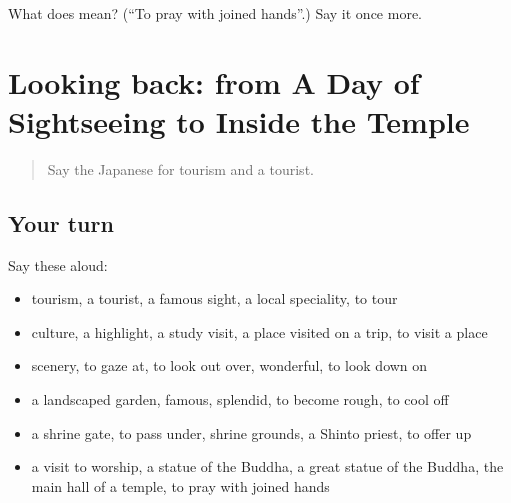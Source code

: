 \begin{tcolorbox}[breakable,colback=teal!4,colframe=teal!35!black,title={Before you move on}]
What does  mean? (\textquotedblleft{}To pray with joined hands\textquotedblright{}.) Say it once more.
\end{tcolorbox}
\section[(dialogue)]{Looking back: from A Day of Sightseeing to Inside the Temple}

\label{lesson:JA-R407-review-402-407}



\begin{quote}
Say the Japanese for tourism and a tourist.
\end{quote}

\subsection*{Your turn}
Say these aloud:

\begin{itemize}
\raggedright
  \item tourism, a tourist, a famous sight, a local speciality, to tour
  \item culture, a highlight, a study visit, a place visited on a trip, to visit a place
  \item scenery, to gaze at, to look out over, wonderful, to look down on
  \item a landscaped garden, famous, splendid, to become rough, to cool off
  \item a shrine gate, to pass under, shrine grounds, a Shinto priest, to offer up
  \item a visit to worship, a statue of the Buddha, a great statue of the Buddha, the main hall of a temple, to pray with joined hands
\end{itemize}

